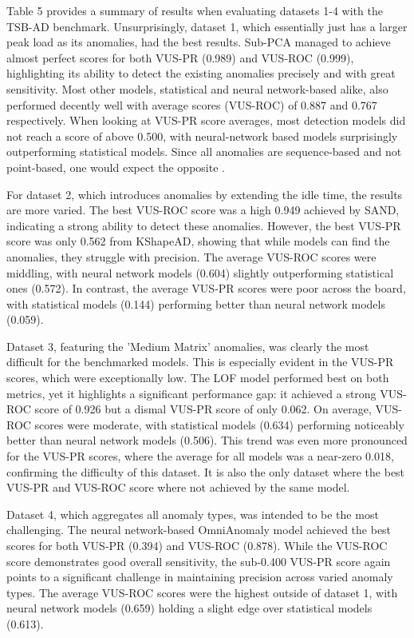 \documentclass[12pt,oneside]{article}
\begin{document}
Table 5 provides a summary of results when evaluating datasets 1-4 with the TSB-AD benchmark.
Unsurprisingly, dataset 1, which essentially just has a larger peak load as its anomalies, had the best results. Sub-PCA managed to achieve almost perfect scores for both VUS-PR (0.989) and VUS-ROC (0.999), highlighting its ability to detect the existing anomalies precisely and with great sensitivity. Most other models, statistical and neural network-based alike, also performed decently well with average scores (VUS-ROC) of 0.887 and 0.767 respectively.
When looking at VUS-PR score averages, most detection models did not reach a score of above 0.500, with neural-network based models surprisingly outperforming statistical models. Since all anomalies are sequence-based and not point-based, one would expect the opposite \parencites[p.~10]{liu2024elephant}[p.~1706]{paparrizos2022tsb}.\par
For dataset 2, which introduces anomalies by extending the idle time, the results are more varied. The best VUS-ROC score was a high 0.949 achieved by SAND, indicating a strong ability to detect these anomalies. However, the best VUS-PR score was only 0.562 from KShapeAD, showing that while models can find the anomalies, they struggle with precision. The average VUS-ROC scores were middling, with neural network models (0.604) slightly outperforming statistical ones (0.572). In contrast, the average VUS-PR scores were poor across the board, with statistical models (0.144) performing better than neural network models (0.059). \par
Dataset 3, featuring the 'Medium Matrix' anomalies, was clearly the most difficult for the benchmarked models. This is especially evident in the VUS-PR scores, which were exceptionally low. The LOF model performed best on both metrics, yet it highlights a significant performance gap: it achieved a strong VUS-ROC score of 0.926 but a dismal VUS-PR score of only 0.062. On average, VUS-ROC scores were moderate, with statistical models (0.634) performing noticeably better than neural network models (0.506). This trend was even more pronounced for the VUS-PR scores, where the average for all models was a near-zero 0.018, confirming the difficulty of this dataset. It is also the only dataset where the best VUS-PR and VUS-ROC score where not achieved by the same model. \par
Dataset 4, which aggregates all anomaly types, was intended to be the most challenging. The neural network-based OmniAnomaly model achieved the best scores for both VUS-PR (0.394) and VUS-ROC (0.878). While the VUS-ROC score demonstrates good overall sensitivity, the sub-0.400 VUS-PR score again points to a significant challenge in maintaining precision across varied anomaly types. The average VUS-ROC scores were the highest outside of dataset 1, with neural network models (0.659) holding a slight edge over statistical models (0.613).
\end{document}
